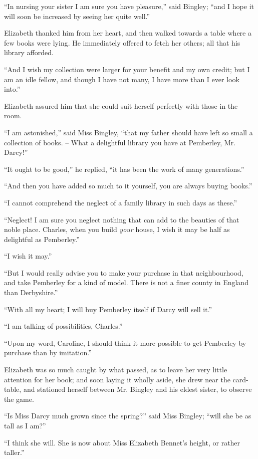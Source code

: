 “In nursing your sister I am sure you have pleasure,”
said Bingley; “and I hope it will soon be increased by
seeing her quite well.”

Elizabeth thanked him from her heart, and then walked
towards a table where a few books were lying. He immediately
offered to fetch her others; all that his library
afforded.

“And I wish my collection were larger for your benefit
and my own credit; but I am an idle fellow, and though
I have not many, I have more than I ever look into.”

Elizabeth assured him that she could suit herself perfectly
with those in the room.

“I am astonished,” said Miss Bingley, “that my father
should have left so small a collection of books. -- What
a delightful library you have at Pemberley, Mr. Darcy!”

“It ought to be good,” he replied, “it has been the
work of many generations.”

“And then you have added so much to it yourself, you
are always buying books.”

“I cannot comprehend the neglect of a family library
in such days as these.”

“Neglect! I am sure you neglect nothing that can add
to the beauties of that noble place. Charles, when you
build \textit{your} house, I wish it may be half as delightful as
Pemberley.”

“I wish it may.”

“But I would really advise you to make your purchase in
that neighbourhood, and take Pemberley for a kind of model.
There is not a finer county in England than Derbyshire.”

“With all my heart; I will buy Pemberley itself if
Darcy will sell it.”

“I am talking of possibilities, Charles.”

“Upon my word, Caroline, I should think it more
possible to get Pemberley by purchase than by imitation.”

Elizabeth was so much caught by what passed, as to
leave her very little attention for her book; and soon
laying it wholly aside, she drew near the card-table, and
stationed herself between Mr. Bingley and his eldest sister,
to observe the game.

“Is Miss Darcy much grown since the spring?” said
Miss Bingley; “will she be as tall as I am?”

“I think she will. She is now about Miss Elizabeth
Bennet’s height, or rather taller.”

